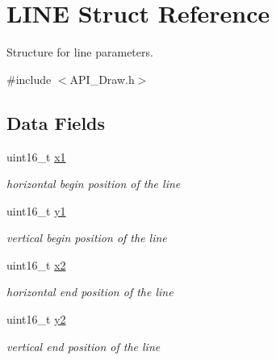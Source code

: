 \hypertarget{struct_l_i_n_e}{}\section{L\+I\+NE Struct Reference}
\label{struct_l_i_n_e}


Structure for line parameters.  




{\ttfamily \#include $<$A\+P\+I\+\_\+\+Draw.\+h$>$}

\subsection*{Data Fields}
\begin{DoxyCompactItemize}
\item 
\mbox{\label{struct_l_i_n_e_aedb5fdfe3c1d1a915b668ba7f3950753}} 
uint16\+\_\+t \hyperlink{struct_l_i_n_e_aedb5fdfe3c1d1a915b668ba7f3950753}{x1}
\begin{DoxyCompactList}\small\item\em horizontal begin position of the line \end{DoxyCompactList}\item 
\mbox{\label{struct_l_i_n_e_a47ada631c22a9d40348069145654f255}} 
uint16\+\_\+t \hyperlink{struct_l_i_n_e_a47ada631c22a9d40348069145654f255}{y1}
\begin{DoxyCompactList}\small\item\em vertical begin position of the line \end{DoxyCompactList}\item 
\mbox{\label{struct_l_i_n_e_ac5bc000f8954f38b7a641a485a26bae7}} 
uint16\+\_\+t \hyperlink{struct_l_i_n_e_ac5bc000f8954f38b7a641a485a26bae7}{x2}
\begin{DoxyCompactList}\small\item\em horizontal end position of the line \end{DoxyCompactList}\item 
\mbox{\label{struct_l_i_n_e_aa377184ba406b3f0c4ac18c935378204}} 
uint16\+\_\+t \hyperlink{struct_l_i_n_e_aa377184ba406b3f0c4ac18c935378204}{y2}
\begin{DoxyCompactList}\small\item\em vertical end position of the line \end{DoxyCompactList}\item 

\end{DoxyCompactItemize}
